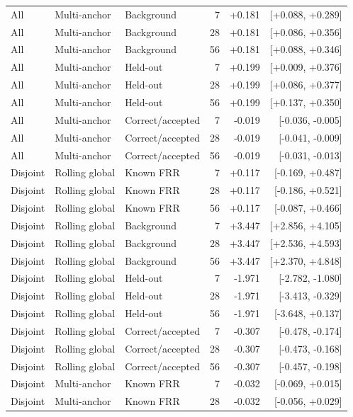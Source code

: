 \begin{longtable}{lllrrr}
\addlinespace
All & Multi-anchor & Background & 7 & +0.181 & [+0.088, +0.289] \\
All & Multi-anchor & Background & 28 & +0.181 & [+0.086, +0.356] \\
All & Multi-anchor & Background & 56 & +0.181 & [+0.088, +0.346] \\
\addlinespace
All & Multi-anchor & Held-out & 7 & +0.199 & [+0.009, +0.376] \\
All & Multi-anchor & Held-out & 28 & +0.199 & [+0.086, +0.377] \\
All & Multi-anchor & Held-out & 56 & +0.199 & [+0.137, +0.350] \\
\addlinespace
All & Multi-anchor & Correct/accepted & 7 & -0.019 & [-0.036, -0.005] \\
All & Multi-anchor & Correct/accepted & 28 & -0.019 & [-0.041, -0.009] \\
All & Multi-anchor & Correct/accepted & 56 & -0.019 & [-0.031, -0.013] \\
\addlinespace
Disjoint & Rolling global & Known FRR & 7 & +0.117 & [-0.169, +0.487] \\
Disjoint & Rolling global & Known FRR & 28 & +0.117 & [-0.186, +0.521] \\
Disjoint & Rolling global & Known FRR & 56 & +0.117 & [-0.087, +0.466] \\
\addlinespace
Disjoint & Rolling global & Background & 7 & +3.447 & [+2.856, +4.105] \\
Disjoint & Rolling global & Background & 28 & +3.447 & [+2.536, +4.593] \\
Disjoint & Rolling global & Background & 56 & +3.447 & [+2.370, +4.848] \\
\addlinespace
Disjoint & Rolling global & Held-out & 7 & -1.971 & [-2.782, -1.080] \\
Disjoint & Rolling global & Held-out & 28 & -1.971 & [-3.413, -0.329] \\
Disjoint & Rolling global & Held-out & 56 & -1.971 & [-3.648, +0.137] \\
\addlinespace
Disjoint & Rolling global & Correct/accepted & 7 & -0.307 & [-0.478, -0.174] \\
Disjoint & Rolling global & Correct/accepted & 28 & -0.307 & [-0.473, -0.168] \\
Disjoint & Rolling global & Correct/accepted & 56 & -0.307 & [-0.457, -0.198] \\
\addlinespace
Disjoint & Multi-anchor & Known FRR & 7 & -0.032 & [-0.069, +0.015] \\
Disjoint & Multi-anchor & Known FRR & 28 & -0.032 & [-0.056, +0.029] \\

\end{longtable}
